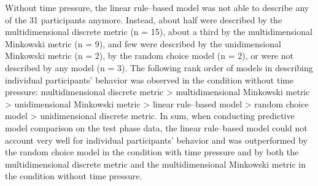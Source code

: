 \documentclass[a4paper,man,natbib]{apa6}
\begin{document}
Without time pressure, the linear rule--based model was not able to describe any of the 31 participants anymore. Instead, about half were described by the multidimensional discrete metric (n = 15), about a third by the multidimensional Minkowski metric (n = 9), and few were described by the unidimensional Minkowski metric (n = 2), by the random choice model (n = 2), or were not described by any model (n = 3). The following rank order of models in describing individual participants' behavior was observed in the condition without time pressure: multidimensional discrete metric > multidimensional Minkowski metric > unidimensional Minkowski metric > linear rule--based model > random choice model > unidimensional discrete metric. In sum, when conducting predictive model comparison on the test phase data, the linear rule--based model could not account very well for individual participants' behavior and was outperformed by the random choice model in the condition with time pressure and by both the multidimensional discrete metric and the multidimensional Minkowski metric in the condition without time pressure.

\end{document}
